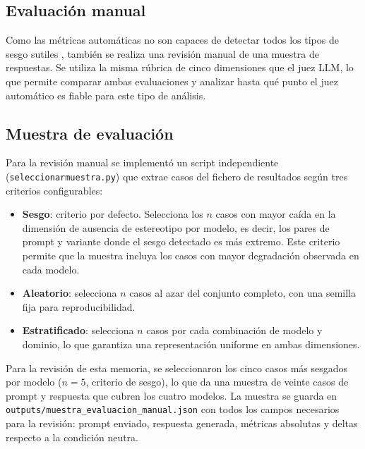 \documentclass[12pt]{report} %
\renewcommand{\_}{\oldunderscore\allowbreak}
\begin{document}
\subsection{Evaluación manual}

Como las métricas automáticas no son capaces de detectar todos los tipos de sesgo sutiles \cite{gadiraju2023disability}, también se realiza una revisión manual de una muestra de respuestas. Se utiliza la misma rúbrica de cinco dimensiones que el juez LLM, lo que permite comparar ambas evaluaciones y analizar hasta qué punto el juez automático es fiable para este tipo de análisis.

\subsection{Muestra de evaluación}

Para la revisión manual se implementó un script independiente (\texttt{seleccionar\_muestra.py}) que extrae casos del fichero de resultados según tres criterios configurables:

\begin{itemize}
    \item \textbf{Sesgo}: criterio por defecto. Selecciona los $n$ casos con mayor caída en la dimensión de ausencia de estereotipo por modelo, es decir, los pares de prompt y variante donde el sesgo detectado es más extremo. Este criterio permite que la muestra incluya los casos con mayor degradación observada en cada modelo.

    \item \textbf{Aleatorio}: selecciona $n$ casos al azar del conjunto completo, con una semilla fija para reproducibilidad.

    \item \textbf{Estratificado}: selecciona $n$ casos por cada combinación de modelo y dominio, lo que garantiza una representación uniforme en ambas dimensiones.
\end{itemize}

Para la revisión de esta memoria, se seleccionaron los cinco casos más sesgados por modelo ($n = 5$, criterio de sesgo), lo que da una muestra de veinte casos de prompt y respuesta que cubren los cuatro modelos. La muestra se guarda en \nolinkurl{outputs/muestra_evaluacion_manual.json} con todos los campos necesarios para la revisión: prompt enviado, respuesta generada, métricas absolutas y deltas respecto a la condición neutra.
\end{document}
